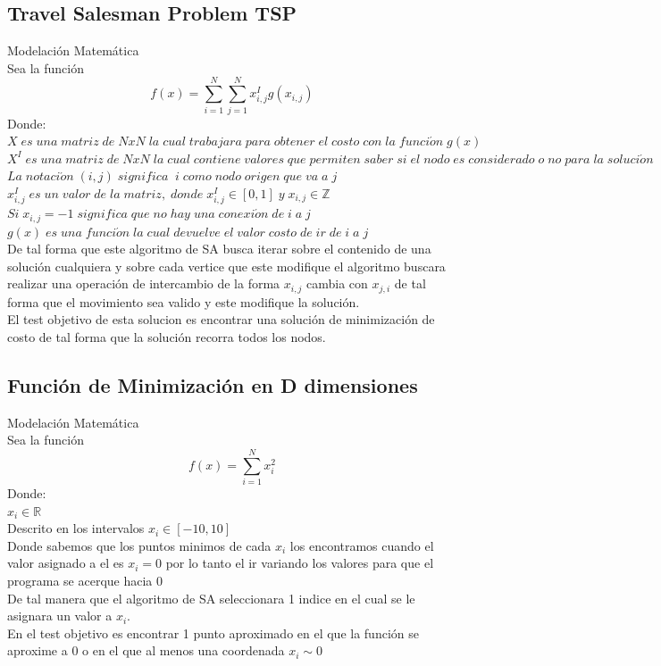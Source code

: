 \documentclass[10pt]{article}
\begin{document}
\subsection{Travel Salesman Problem TSP}
Modelación Matemática\\
Sea la función
\[f(x)=\sum_{i=1}^{N}\sum_{j=1}^{N}x^{I}_{i,j}g(x_{i,j})\]
Donde:\\
\(\displaystyle X\;es\;una\;matriz\;de\;NxN\;la\;cual\;trabajara\;para\;obtener\;el\;costo\;con\;la\;funci\acute{o}n\;g(x)\)\\\vspace{0.25cm}
\(\displaystyle X^{I}\;es\;una\;matriz\;de\;NxN\;la\;cual\;contiene\;valores\;que\;permiten\;saber\;si\;el\;nodo\;es\;considerado\;o\;no\;para\;la\;soluci\acute{o}n\;\)\\\vspace{0.25cm}
\(\displaystyle La\;notaci\acute{o}n\;(i,j)\;significa\;\;i\;como\;nodo\;origen\;que\;va\;a\;j\)\\\vspace{0.25cm}
\(\displaystyle x^{I}_{i,j}\;es\;un\;valor\;de\;la\;matriz,\;donde\;x^{I}_{i,j}\in[0,1]\;y\;x_{i,j}\in\mathbb{Z}\)\\\vspace{0.25cm}
\(\displaystyle Si\;x_{i,j}=-1\;significa\;que\;no\;hay\;una\;conexi\acute{o}n\;de\;i\;a\;j\)\\\vspace{0.25cm}
\(\displaystyle g(x)\;es\;una\;funci\acute{o}n\;la\;cual\;devuelve\;el\;valor\;costo\;de\;ir\;de\;i\;a\;j\)\\\vspace{0.25cm}
De tal forma que este algoritmo de SA busca iterar sobre el contenido de una solución cualquiera y sobre cada vertice que este modifique el algoritmo buscara realizar una operación de intercambio de la forma $x_{i,j}$ cambia con $x_{j,i}$ de tal forma que el movimiento sea valido y este modifique la solución.\\
El test objetivo de esta solucion es encontrar una solución de minimización de costo de tal forma que la solución recorra todos los nodos.
\subsection{Función de Minimización en D dimensiones}
Modelación Matemática\\
Sea la función
\[f(x)=\sum_{i=1}^{N}x_{i}^{2}\]
Donde:\\
\(\displaystyle x_{i}\in\mathbb{R}\)\\\vspace{0.25cm}Descrito en los intervalos \(\displaystyle x_{i}\in[-10,10]\)\\\vspace{0.25cm}
Donde sabemos que los puntos minimos de cada $x_{i}$ los encontramos cuando el valor asignado a el es $x_{i}=0$ por lo tanto el ir variando los valores para que el programa se acerque hacia $0$\\
De tal manera que el algoritmo de SA seleccionara 1 indice en el cual se le asignara un valor a $x_{i}$.\\
En el test objetivo es encontrar 1 punto aproximado en el que la función se aproxime a $0$ o en el que al menos una coordenada $x_{i}\sim 0$
\end{document}
